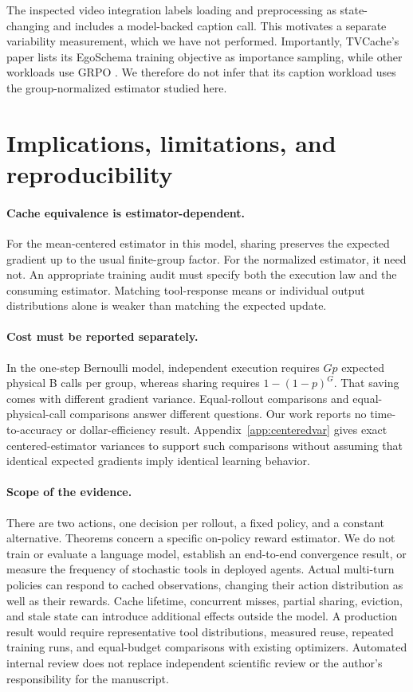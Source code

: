 \documentclass[10pt,letterpaper]{article}
\begin{document}
The inspected video integration labels loading and preprocessing as
state-changing and includes a model-backed caption call. This motivates a
separate variability measurement, which we have not performed. Importantly,
TVCache's paper lists its EgoSchema training objective as importance sampling,
while other workloads use GRPO \cite{tvcache}. We therefore do not infer that
its caption workload uses the group-normalized estimator studied here.

\section{Implications, limitations, and reproducibility}
\paragraph{Cache equivalence is estimator-dependent.}
For the mean-centered estimator in this model, sharing preserves the expected
gradient up to the usual finite-group factor. For the normalized estimator, it
need not. An appropriate training audit must specify both the execution law and
the consuming estimator. Matching tool-response means or individual output
distributions alone is weaker than matching the expected update.

\paragraph{Cost must be reported separately.}
In the one-step Bernoulli model, independent execution requires $Gp$ expected
physical B calls per group, whereas sharing requires $1-(1-p)^G$. That saving
comes with different gradient variance. Equal-rollout comparisons and
equal-physical-call comparisons answer different questions. Our work reports
no time-to-accuracy or dollar-efficiency result. Appendix~\ref{app:centeredvar}
gives exact centered-estimator variances to support such comparisons without
assuming that identical expected gradients imply identical learning behavior.

\paragraph{Scope of the evidence.}
There are two actions, one decision per rollout, a fixed policy, and a constant
alternative. Theorems concern a specific on-policy reward estimator. We do not
train or evaluate a language model, establish an end-to-end convergence result,
or measure the frequency of stochastic tools in deployed agents. Actual
multi-turn policies can respond to cached observations, changing their action
distribution as well as their rewards. Cache lifetime, concurrent misses,
partial sharing, eviction, and stale state can introduce additional effects
outside the model. A production result would require representative tool
distributions, measured reuse, repeated training runs, and equal-budget
comparisons with existing optimizers. Automated internal review does not
replace independent scientific review or the author's responsibility for the
manuscript.
\end{document}
